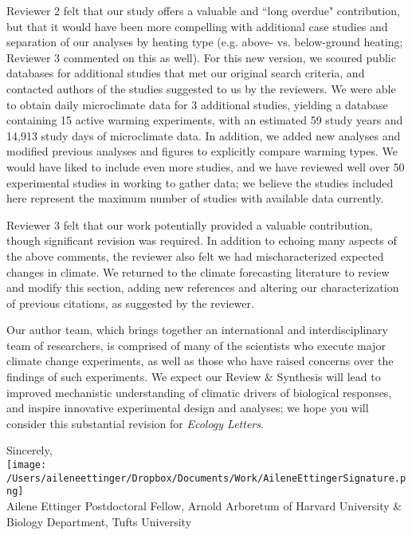 \documentclass[11pt,a4paper]{letter}
\begin{document}
\begin{letter}{}
Reviewer 2 felt that our study offers a valuable and ``long overdue" contribution, but that it would have been more compelling with additional case studies and separation of our analyses by heating type (e.g. above- vs. below-ground heating; Reviewer 3 commented on this as well). For this new version, we scoured public databases for additional studies that met our original search criteria, and contacted authors of the studies suggested to us by the reviewers. We were able to obtain daily microclimate data for 3 additional studies, yielding a database containing 15 active warming experiments, with an estimated 59 study years and 14,913 study days of microclimate data. In addition, we added new analyses and modified previous analyses and figures to explicitly compare warming types.  We would have liked to include even more studies, and we have reviewed well over 50 experimental studies in working to gather data; we believe the studies included here represent the maximum number  of studies with available data currently. 

Reviewer 3 felt that our work potentially provided a valuable contribution, though significant revision was required.  In addition to echoing many aspects of the above comments, the reviewer also felt we had mischaracterized expected changes in climate. We returned to the climate forecasting literature to review and modify this section, adding new references and altering our characterization of previous citations, as suggested by the reviewer. 

Our author team, which brings together an international and interdisciplinary team of researchers, is comprised of many of the scientists who execute major climate change experiments, as well as those who have raised concerns over the findings of such experiments.  We expect our Review \& Synthesis will lead to improved mechanistic understanding of climatic drivers of biological responses, and inspire innovative experimental design and analyses; we hope you will consider this substantial revision for \emph{Ecology Letters}.

Sincerely,\\

\texttt{[image: /Users/aileneettinger/Dropbox/Documents/Work/AileneEttingerSignature.png]} \\
Ailene Ettinger
Postdoctoral Fellow, Arnold Arboretum of Harvard University \& Biology Department, Tufts University



\end{letter}
\end{document}
